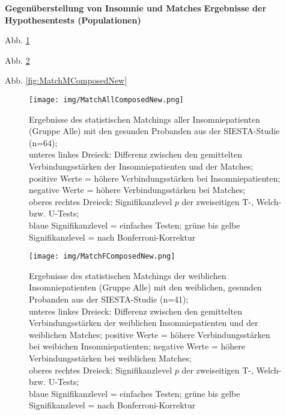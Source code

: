 \textbf{Gegenüberstellung von Insomnie und Matches}
\textbf{Ergebnisse der Hypothesentests (Populationen)}

Abb. \ref{fig:MatchAllComposedNew}

Abb. \ref{fig:MatchFComposedNew}

Abb. \ref{fig:MatchMComposedNew}




\begin{figure}[H]
	\centering
	\texttt{[image: img/MatchAllComposedNew.png]}
	\caption[Ergebnisse des statistischen Matchings der Insomniepatienten mit den gesunden Probanden]{Ergebnisse des statistischen Matchings aller Insomniepatienten (Gruppe Alle) mit den gesunden Probanden aus der SIESTA-Studie (n=64);\\unteres linkes Dreieck: Differenz zwischen den gemittelten Verbindungsstärken der Insomniepatienten und der Matches; positive Werte = höhere Verbindungsstärken bei Insomniepatienten; negative Werte = höhere Verbindungsstärken bei Matches;\\oberes rechtes Dreieck: Signifikanzlevel $p$ der zweiseitigen T-, Welch- bzw. U-Tests;\\blaue Signifikanzlevel = einfaches Testen; grüne bis gelbe Signifikanzlevel = nach Bonferroni-Korrektur}
	\label{fig:MatchAllComposedNew}
\end{figure}




\begin{figure}[H]
	\centering
	\texttt{[image: img/MatchFComposedNew.png]}
	\caption[Ergebnisse des statistischen Matchings der weiblichen Insomniepatienten mit den gesunden Probanden]{Ergebnisse des statistischen Matchings der weiblichen Insomniepatienten (Gruppe Alle) mit den weiblichen, gesunden Probanden aus der SIESTA-Studie (n=41);\\unteres linkes Dreieck: Differenz zwischen den gemittelten Verbindungsstärken der weiblichen Insomniepatienten und der weiblichen Matches; positive Werte = höhere Verbindungsstärken bei weibichen Insomniepatienten; negative Werte = höhere Verbindungsstärken bei weiblichen Matches;\\oberes rechtes Dreieck: Signifikanzlevel $p$ der zweiseitigen T-, Welch- bzw. U-Tests;\\blaue Signifikanzlevel = einfaches Testen; grüne bis gelbe Signifikanzlevel = nach Bonferroni-Korrektur}
	\label{fig:MatchFComposedNew}
\end{figure}





